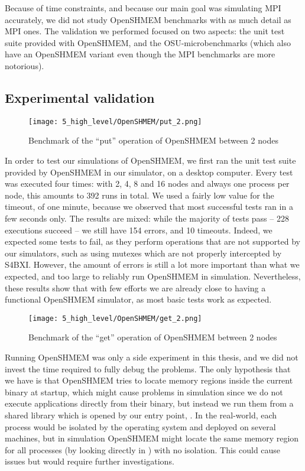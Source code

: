 Because of time constraints, and because our main goal was simulating MPI
accurately, we did not study OpenSHMEM benchmarks with as much detail as MPI
ones. The validation we performed focused on two aspects: the unit test suite
provided with OpenSHMEM, and the OSU-microbenchmarks (which also have an
OpenSHMEM variant even though the MPI benchmarks are more notorious).

\subsection{Experimental validation}

\begin{figure}[!b]
    \centering
    \texttt{[image: 5\_high\_level/OpenSHMEM/put\_2.png]}
    \caption{Benchmark of the ``put'' operation of OpenSHMEM between 2 nodes}
    \label{fig:5_high_level:shmem_put}
\end{figure}

In order to test our simulations of OpenSHMEM, we first ran the unit test suite
provided by OpenSHMEM in our simulator, on a desktop computer. Every test was
executed four times: with 2, 4, 8 and 16 nodes and always one process per node,
this amounts to 392 runs in total. We used a fairly low value for the timeout,
of one minute, because we observed that most successful tests ran in a few
seconds only. The results are mixed: while the majority of tests pass -- 228
executions succeed -- we still have 154 errors, and 10 timeouts. Indeed, we
expected some tests to fail, as they perform operations that are not supported
by our simulators, such as using  mutexes which are not properly
intercepted by S4BXI. However, the amount of errors is still a lot more
important than what we expected, and too large  to reliably run OpenSHMEM in
simulation. Nevertheless, these results show that with few efforts we are
already close to having a functional OpenSHMEM simulator, as most basic tests
work as expected.

\begin{figure}[!h]
    \centering
    \texttt{[image: 5\_high\_level/OpenSHMEM/get\_2.png]}
    \caption{Benchmark of the ``get'' operation of OpenSHMEM between 2 nodes}
    \label{fig:5_high_level:shmem_get}
\end{figure}

Running OpenSHMEM was only a side experiment in this thesis, and we did not
invest the time required to fully debug the problems. The only hypothesis that
we have is that OpenSHMEM tries to locate memory regions inside the current
binary at startup, which might cause problems in simulation since we do not
execute applications directly from their binary, but instead we run them from a
shared library which is opened by our entry point, . In the
real-world, each process would be isolated by the operating system and deployed
on several machines, but in simulation OpenSHMEM might locate the same memory
region for all processes (by looking directly in ) with no
isolation. This could cause issues but would require further investigations.

